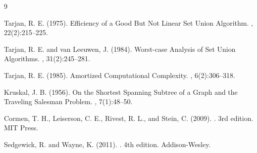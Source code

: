 \documentclass[12pt]{article}
\begin{document}

\begin{thebibliography}{9}

Tarjan, R. E. (1975).
\newblock Efficiency of a Good But Not Linear Set Union Algorithm.
, 22(2):215--225.

Tarjan, R. E. and van Leeuwen, J. (1984).
\newblock Worst-case Analysis of Set Union Algorithms.
, 31(2):245--281.

Tarjan, R. E. (1985).
\newblock Amortized Computational Complexity.
, 6(2):306--318.

Kruskal, J. B. (1956).
\newblock On the Shortest Spanning Subtree of a Graph and the Traveling Salesman Problem.
, 7(1):48--50.

Cormen, T. H., Leiserson, C. E., Rivest, R. L., and Stein, C. (2009).
. 3rd edition.
\newblock MIT Press.

Sedgewick, R. and Wayne, K. (2011).
. 4th edition.
\newblock Addison-Wesley.

\end{thebibliography}
\end{document}
